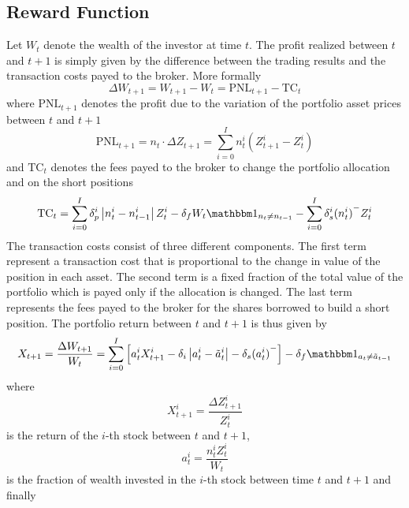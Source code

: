\subsection{Reward Function}
Let $W_t$ denote the wealth of the investor at time $t$. The profit realized
between $t$ and $t+1$ is simply given by the difference between the trading
results and the transaction costs payed to the broker. More formally
\begin{equation*}
	\Delta W_{t+1} = W_{t+1} - W_t = \text{PNL}_{t+1} - \text{TC}_{t}	
\end{equation*}
where $\text{PNL}_{t+1}$ denotes the profit due to the variation of the
portfolio asset prices between $t$ and $t+1$
\begin{equation*}
	\text{PNL}_{t+1} = {n}_t \cdot \Delta{Z}_{t+1} = \sum^{I}_{i=0} 
	n_t^i (Z_{t+1}^i - Z_t^i) 
\end{equation*}
and $\text{TC}_t$ denotes the fees payed to the broker to change the portfolio
allocation and on the short positions
\begin{equation*}
	\text{TC}_t = \sum^{I}_{i=0} \delta_p^i \left| n_t^i - n_{t-1}^i\right| Z_t^i 
				- \delta_f W_t \ind{{n}_t \neq {n}_{t-1}} 
				- \sum^{I}_{i=0} \delta_s^i {(n_t^i)}^{-} Z_t^i
\end{equation*}
The transaction costs consist of three different components. The first term 
represent a transaction cost that is proportional to the change in value of the 
position in each asset. The second term is a fixed fraction of the total value
of the portfolio which is payed only if the allocation is changed. The last
term represents the fees payed to the broker for the shares borrowed to build a
short position. The portfolio return between $t$ and $t+1$ is thus given by
\begin{equation}\label{eq:portfolio_return}
	X_{t+1} = \frac{\Delta W_{t+1}}{W_t} = \sum^{I}_{i=0} \left[ a_t^i
	X_{t+1}^i - \delta_i \left| a_t^i - \tilde{a}_t^i \right| - \delta_s
	{(a_t^i)}^- \right] - \delta_f \ind{{a}_t \neq \tilde{{a}}_{t-1}}  
\end{equation}
where 
\begin{equation*}
	X_{t+1}^i = \frac{\Delta Z_{t+1}^i}{Z_t^i}
\end{equation*}
is the return of the $i$-th stock between $t$ and $t+1$, 
\begin{equation*}
	a_t^i = \frac{n_t^i Z_t^i}{W_t}
\end{equation*}
is the fraction of wealth invested in the $i$-th stock between time $t$ and
$t+1$ and finally 
